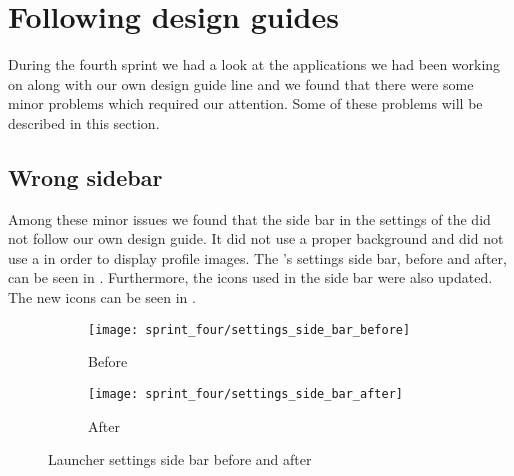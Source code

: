 
\section{Following design guides}
\label{sec:following_design_guides}
During the fourth sprint we had a look at the applications we had been working on along with our own design guide line and we found that there were some minor problems which required our attention. Some of these problems will be described in this section.

\subsection{Wrong sidebar}
\label{sec:wrong_sidebar}
Among these minor issues we found that the side bar in the settings of the \launcher did not follow our own design guide. It did not use a proper background and did not use a  in order to display profile images. The \launcher's settings side bar, before and after, can be seen in . Furthermore, the icons used in the side bar were also updated. The new icons can be seen in .

\begin{figure}[!htbp]
    \centering

    \begin{subfigure}[t]{0.3\textwidth}
        \texttt{[image: sprint\_four/settings\_side\_bar\_before]}
        \caption{Before}
        \label{fig:launcher_settings_side_bar_before}
    \end{subfigure}
    \hspace{5em} 
    \begin{subfigure}[t]{0.3\textwidth}
        \texttt{[image: sprint\_four/settings\_side\_bar\_after]}
        \caption{After}
        \label{fig:launcher_settings_side_bar_after}
    \end{subfigure}
    
    \caption{Launcher settings side bar before and after}
    \label{fig:launcher_settings_side_bar_before_and_after}
\end{figure}